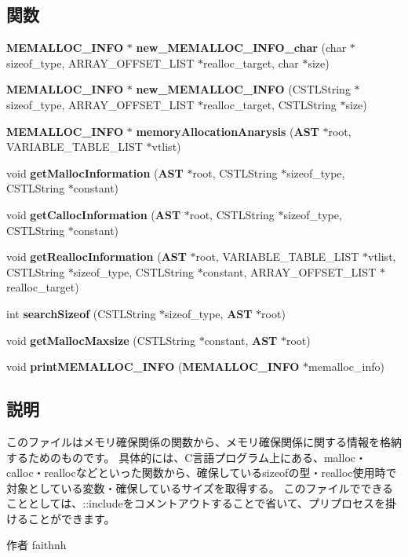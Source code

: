 \subsection*{関数}
\begin{DoxyCompactItemize}
\item 
{\bf MEMALLOC\_\-INFO} $\ast$ {\bf new\_\-MEMALLOC\_\-INFO\_\-char} (char $\ast$sizeof\_\-type, ARRAY\_\-OFFSET\_\-LIST $\ast$realloc\_\-target, char $\ast$size)
\item 
{\bf MEMALLOC\_\-INFO} $\ast$ {\bf new\_\-MEMALLOC\_\-INFO} (CSTLString $\ast$sizeof\_\-type, ARRAY\_\-OFFSET\_\-LIST $\ast$realloc\_\-target, CSTLString $\ast$size)
\item 
{\bf MEMALLOC\_\-INFO} $\ast$ {\bf memoryAllocationAnarysis} ({\bf AST} $\ast$root, VARIABLE\_\-TABLE\_\-LIST $\ast$vtlist)
\item 
void {\bf getMallocInformation} ({\bf AST} $\ast$root, CSTLString $\ast$sizeof\_\-type, CSTLString $\ast$constant)
\item 
void {\bf getCallocInformation} ({\bf AST} $\ast$root, CSTLString $\ast$sizeof\_\-type, CSTLString $\ast$constant)
\item 
void {\bf getReallocInformation} ({\bf AST} $\ast$root, VARIABLE\_\-TABLE\_\-LIST $\ast$vtlist, CSTLString $\ast$sizeof\_\-type, CSTLString $\ast$constant, ARRAY\_\-OFFSET\_\-LIST $\ast$realloc\_\-target)
\item 
int {\bf searchSizeof} (CSTLString $\ast$sizeof\_\-type, {\bf AST} $\ast$root)
\item 
void {\bf getMallocMaxsize} (CSTLString $\ast$constant, {\bf AST} $\ast$root)
\item 
void {\bfseries printMEMALLOC\_\-INFO} ({\bf MEMALLOC\_\-INFO} $\ast$memalloc\_\-info)\label{_memalloc_info_8h_aabbf52f2ccbd1ca6f68a8fb95b44f694}

\end{DoxyCompactItemize}


\subsection{説明}
このファイルはメモリ確保関係の関数から、メモリ確保関係に関する情報を格納するためのものです。 具体的には、C言語プログラム上にある、malloc・calloc・reallocなどといった関数から、確保しているsizeofの型・realloc使用時で対象としている変数・確保しているサイズを取得する。 このファイルでできることとしては、::includeをコメントアウトすることで省いて、プリプロセスを掛けることができます。 \begin{DoxyAuthor}{作者}
faithnh 
\end{DoxyAuthor}


